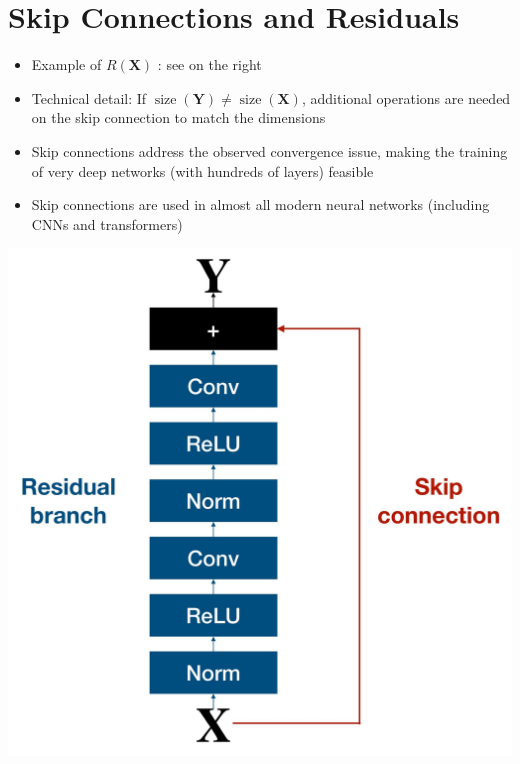 \documentclass[10pt]{article}
\begin{document}
\section*{Skip Connections and Residuals}
\begin{itemize}
  \item Example of $R(\mathbf{X})$ : see on the right

  \item Technical detail: If $\operatorname{size}(\mathbf{Y}) \neq \operatorname{size}(\mathbf{X})$, additional operations are needed on the skip connection to match the dimensions

  \item Skip connections address the observed convergence issue, making the training of very deep networks (with hundreds of layers) feasible

  \item Skip connections are used in almost all modern neural networks (including CNNs and transformers)

\end{itemize}

\begin{center}
\includegraphics[max width=\textwidth]{2024_01_08_959e2db67a31f073f6d2g-20}
\end{center}
\end{document}
